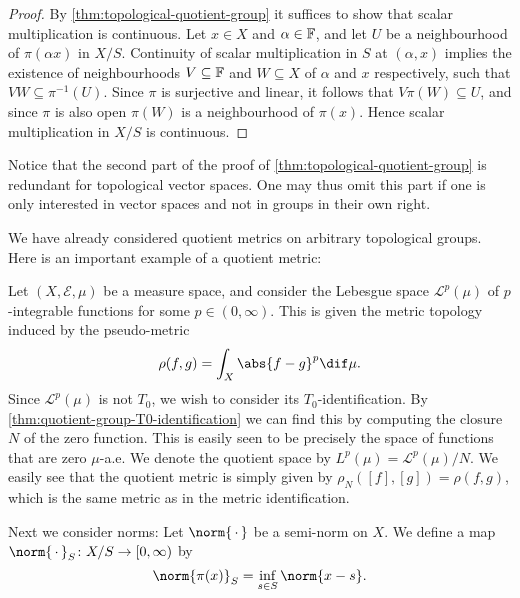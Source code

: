 \documentclass[article, a4paper, 11pt, oneside]{memoir}
\numberwithin{equation}{chapter}
\newcommand{\preim}{^{-1}}
\begin{document}
\begin{proof}
    By \cref{thm:topological-quotient-group} it suffices to show that scalar multiplication is continuous. Let $x \in X$ and $\alpha \in \mathbb{F}$, and let $U$ be a neighbourhood of $\pi(\alpha x)$ in $X/S$. Continuity of scalar multiplication in $S$ at $(\alpha, x)$ implies the existence of neighbourhoods $V \subseteq \mathbb{F}$ and $W \subseteq X$ of $\alpha$ and $x$ respectively, such that $VW \subseteq \pi\preim(U)$. Since $\pi$ is surjective and linear, it follows that $V \pi(W) \subseteq U$, and since $\pi$ is also open $\pi(W)$ is a neighbourhood of $\pi(x)$. Hence scalar multiplication in $X/S$ is continuous.
\end{proof}
%
Notice that the second part of the proof of \cref{thm:topological-quotient-group} is redundant for topological vector spaces. One may thus omit this part if one is only interested in vector spaces and not in groups in their own right.

We have already considered quotient metrics on arbitrary topological groups. Here is an important example of a quotient metric:

\newcommand{\calL}{\mathcal{L}}
\newcommand{\calE}{\mathcal{E}}

\begin{example}[$\calL^p(\mu)$- and $L^p(\mu)$-spaces]
    Let $(X, \calE, \mu)$ be a measure space, and consider the Lebesgue space $\calL^p(\mu)$ of $p$-integrable functions for some $p \in (0,\infty)$. This is given the metric topology induced by the pseudo-metric
    \begin{equation*}
        \rho(f,g)
            = \int_X \abs{f-g}^p \dif\mu.
    \end{equation*}
    Since $\calL^p(\mu)$ is not $T_0$, we wish to consider its $T_0$-identification. By \cref{thm:quotient-group-T0-identification} we can find this by computing the closure $N$ of the zero function. This is easily seen to be precisely the space of functions that are zero $\mu$-a.e. We denote the quotient space by $L^p(\mu) = \calL^p(\mu)/N$. We easily see that the quotient metric is simply given by $\rho_N([f],[g]) = \rho(f,g)$, which is the same metric as in the metric identification.
\end{example}

Next we consider norms: Let $\norm{\,\cdot\,}$ be a semi-norm on $X$. We define a map $\norm{\,\cdot\,}_S \colon X/S \to [0, \infty)$ by
%
\begin{equation*}
    \norm{\pi(x)}_S
        = \inf_{s \in S} \norm{x - s}.
\end{equation*}
\end{document}
